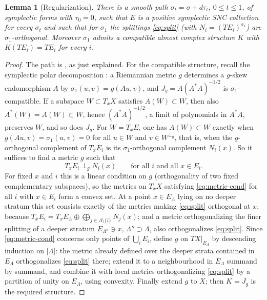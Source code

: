 \documentclass[11pt]{article}
\newtheorem{lemma}[theorem]{Lemma}
\theoremstyle{remark}
\begin{document}
\begin{lemma}[Regularization]\label{lem:reg}
There is a smooth path $\sigma_t=\sigma+d\tau_t$, $0\le t\le1$, of
symplectic forms with $\tau_0=0$, such that $E$ is a positive symplectic
SNC collection for every $\sigma_t$ and such that for $\sigma_1$ the
splittings \eqref{eq:split} (with $N_i=(TE_i)^{\sigma_1}$) are
$\sigma_1$-orthogonal. Moreover $\sigma_1$ admits a compatible almost
complex structure $K$ with $K(TE_i)=TE_i$ for every $i$.
\end{lemma}

\begin{proof}
The path is \cite[Theorem 2.13]{FMZ}, as just explained. For the
compatible structure, recall the symplectic polar decomposition
\cite[proof of Theorem 2.16]{Wendl}: a Riemannian metric $g$ determines
a $g$-skew endomorphism $A$ by $\sigma_1(u,v)=g(Au,v)$, and
$J_g=A(A^*A)^{-1/2}$ is $\sigma_1$-compatible. If a subspace
$W\subset T_xX$ satisfies $A(W)\subset W$, then also
$A^*(W)=A(W)\subset W$, hence $(A^*A)^{-1/2}$, a limit of polynomials in
$A^*A$, preserves $W$, and so does $J_g$. For $W=T_xE_i$ one has
$A(W)\subset W$ exactly
when $g(Au,v)=\sigma_1(u,v)=0$ for all $u\in W$ and $v\in W^{\perp_g}$,
that is, when the $g$-orthogonal complement of $T_xE_i$ is its
$\sigma_1$-orthogonal complement $N_i(x)$. So it suffices to find a
metric $g$ such that
\begin{equation}\label{eq:metric-cond}
 T_xE_i\perp_g N_i(x)\qquad\text{for all }i\text{ and all }x\in E_i.
\end{equation}
For fixed $x$ and $i$ this is a linear condition on $g$ (orthogonality
of two fixed complementary subspaces), so the metrics on $T_xX$
satisfying \eqref{eq:metric-cond} for all $i$ with $x\in E_i$ form a
convex set. At a point $x\in E_\Lambda$ lying on no deeper stratum this
set consists exactly of the metrics making \eqref{eq:split} orthogonal
at $x$, because
$T_xE_i=T_xE_\Lambda\oplus\bigoplus_{j\in\Lambda\setminus\{i\}}N_j(x)$;
and a metric orthogonalizing the finer splitting of a deeper stratum
$E_{\Lambda''}\ni x$, $\Lambda''\supset\Lambda$, also orthogonalizes
\eqref{eq:split}. Since \eqref{eq:metric-cond} concerns only points of
$\bigcup_iE_i$, define $g$ on $TX|_{E_\Lambda}$ by descending induction
on $|\Lambda|$: the metric already defined over the deeper strata
contained in $E_\Lambda$ orthogonalizes \eqref{eq:split} there; extend
it to a neighbourhood in $E_\Lambda$ summand by summand, and combine it
with local metrics orthogonalizing \eqref{eq:split} by a partition of
unity on $E_\Lambda$, using convexity. Finally extend $g$ to $X$; then
$K=J_g$ is the required structure.
\end{proof}
\end{document}
